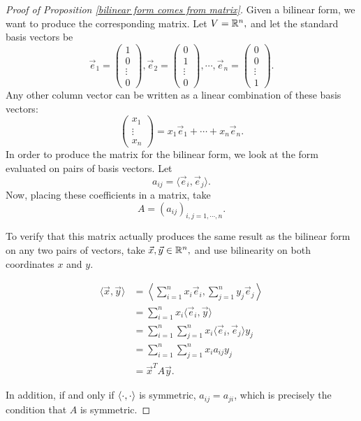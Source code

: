 \begin{proof}[Proof of Proposition \ref{bilinear form comes from matrix}]
Given a bilinear form, we want to produce the corresponding matrix. Let $V = \mathbb R^n,$ and let the standard basis vectors be 
\[\vec{e}_1 = \begin{pmatrix}
1 \\ 0 \\ \vdots \\ 0
\end{pmatrix}, \vec{e}_2 = \begin{pmatrix}
0 \\ 1 \\ \vdots \\ 0
\end{pmatrix}, \cdots, \vec{e}_n = \begin{pmatrix}
0 \\ 0 \\ \vdots \\ 1
\end{pmatrix}.\] Any other column vector can be written as a linear combination of these basis vectors: \[\begin{pmatrix}
x_1 \\ \vdots \\ x_n
\end{pmatrix} = x_1 \vec{e}_1 + \cdots + x_n\vec{e}_n.\] In order to produce the matrix for the bilinear form, we look at the form evaluated on pairs of basis vectors. Let \[a_{ij} = \langle \vec{e}_i, \vec{e}_j \rangle.\] Now, placing these coefficients in a matrix, take \[A = (a_{ij})_{i, j = 1, \cdots, n}.\]

To verify that this matrix actually produces the same result as the bilinear form on any two pairs of vectors, take $\vec{x}, \vec{y} \in \mathbb R^n,$ and use bilinearity on both coordinates $x$ and $y$.

\begin{align*}
    \langle \vec{x}, \vec{y}\rangle &= \left\langle \sum_{i = 1}^n x_i \vec{e}_i, \sum_{j = 1}^n y_j\vec{e}_j \right\rangle \\
    &= \sum_{i = 1}^n x_i \langle \vec{e}_i, \vec{y} \rangle \\
    &= \sum_{i = 1}^n \sum_{j = 1}^n x_i \langle \vec{e}_i, \vec{e}_j \rangle y_j \\
    &= \sum_{i = 1}^n \sum_{j = 1}^n x_i a_{ij} y_j \\
    &= \vec{x}^T A\vec{y}.
\end{align*}

In addition, if and only if $\langle \cdot, \cdot \rangle$ is symmetric,  $a_{ij} = a_{ji}$, which is precisely the condition that $A$ is symmetric.
\end{proof}

